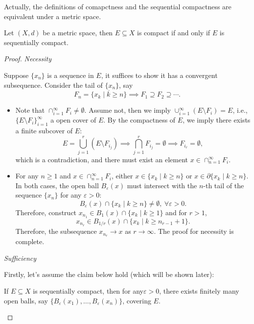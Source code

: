 Actually, the definitions of comapctness and the sequential compactness are equivalent under a metric space.

\begin{theorem}
Let $(X,d)$ be a metric space, then $E\subseteq X$ is compact if and only if $E$ is sequentially compact.
\end{theorem}

\begin{proof}

\textit{Necessity}

Suppose $\{x_n\}$ is a sequence in $E$, it suffices to show it has a convergent subsequence. 
Consider the tail of $\{x_n\}$, say 
\[
F_n=\overline{\{x_k\mid k\ge n\}}\implies F_1\supseteq F_2\supseteq\cdots.
\]
\begin{itemize}
\item
Note that $\cap_{i=1}^\infty F_i\ne\emptyset$. 
Assume not, then we imply $\cup_{i=1}^\infty(E\setminus F_i)=E$, i.e., $\{E\setminus F_i\}_{i=1}^\infty$ a open cover of $E$. 
By the compactness of $E$, we imply there exists a finite subcover of $E$:
\[
E=\bigcup_{j=1}^r(E\setminus F_{i_j})\implies \bigcap_{j=1}^rF_{i_j}=\emptyset\implies F_{i_r}=\emptyset,
\]
which is a contradiction, and there must exist an element $x\in\cap_{n=1}^\infty F_i$.
\item
For any $n\ge1$ and $x\in\cap_{n=1}^\infty F_i$, either $x\in\{x_k\mid k\ge n\}$ or $x\in\partial\{x_k\mid k\ge n\}$. In both cases, the open ball $B_{\varepsilon}(x)$ must intersect with the $n$-th tail of the sequence $\{x_n\}$ for any $\varepsilon>0$:
\[
B_{\varepsilon}(x)\cap\{x_k\mid k\ge n\}\ne\emptyset,\ \forall \varepsilon>0.
\]
Therefore, construct $x_{n_1}\in B_1(x)\cap\{x_k\mid k\ge1\}$ and for $r>1$, 
\[
x_{n_r}\in B_{1/r}(x)\cap\{x_{k}\mid k\ge n_{r-1}+1\}.
\]
Therefore, the subsequence $x_{n_r}\to x$ as $r\to\infty$. The proof for necessity is complete.
\end{itemize}

\textit{Sufficiency}

Firstly, let's assume the claim below hold (which will be shown later):
\begin{proposition}\label{pro:2:18}
If $E\subseteq X$ is sequentially compact, then for any$\varepsilon>0$, there exists finitely many open balls, say $\{B_{\varepsilon}(x_1),\dots,B_{\varepsilon}(x_n)\}$, covering $E$.
\end{proposition}


\end{proof}
